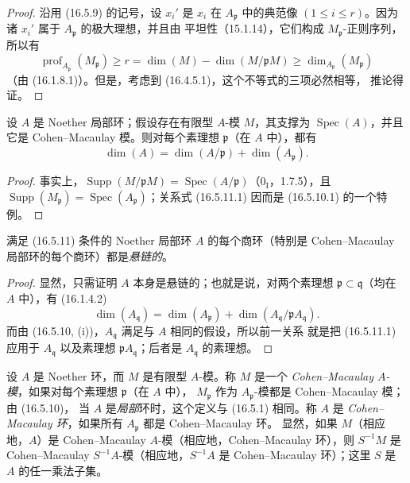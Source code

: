 \begin{proof}
沿用 (16.5.9) 的记号，设 $x_i'$ 是 $x_i$ 在 $A_{\mathfrak{p}}$ 中的典范像
$(1\leq i\leq r)$。因为诸 $x_i'$ 属于 $A_{\mathfrak{p}}$ 的极大理想，并且由
平坦性（15.1.14），它们构成 $M_{\mathfrak{p}}$-正则序列，所以有
\[
  \operatorname{prof}_{A_{\mathfrak{p}}}(M_{\mathfrak{p}})
  \geq r=\dim(M)-\dim(M/\mathfrak{p}M)
  \geq\dim_{A_{\mathfrak{p}}}(M_{\mathfrak{p}})
\]
（由 (16.1.8.1)）。但是，考虑到 (16.4.5.1)，这个不等式的三项必然相等，
推论得证。
\end{proof}


\begin{corollary}[16.5.11]
\label{0.16.5.11-fr}
设 $A$ 是 Noether 局部环；假设存在有限型 $A$-模 $M$，其支撑为
$\operatorname{Spec}(A)$，并且它是 Cohen--Macaulay 模。则对每个素理想
$\mathfrak{p}$（在 $A$ 中），都有
\begin{equation}
\label{0.16.5.11.1-fr}
\tag{16.5.11.1}
  \dim(A)=\dim(A/\mathfrak{p})+\dim(A_{\mathfrak{p}}).
\end{equation}
\end{corollary}

\begin{proof}
事实上，$\operatorname{Supp}(M/\mathfrak{p}M)
=\operatorname{Spec}(A/\mathfrak{p})$（$0_{\mathrm I}$，1.7.5），且
$\operatorname{Supp}(M_{\mathfrak{p}})
=\operatorname{Spec}(A_{\mathfrak{p}})$；关系式 (16.5.11.1) 因而是
(16.5.10.1) 的一个特例。
\end{proof}

\begin{corollary}[16.5.12]
\label{0.16.5.12-fr}
满足 (16.5.11) 条件的 Noether 局部环 $A$ 的每个商环（特别是
Cohen--Macaulay 局部环的每个商环）都是\emph{悬链的}。
\end{corollary}

\begin{proof}
显然，只需证明 $A$ 本身是悬链的；也就是说，对两个素理想
$\mathfrak{p}\subset\mathfrak{q}$（均在 $A$ 中），有 (16.1.4.2)
\[
  \dim(A_{\mathfrak{q}})
  =\dim(A_{\mathfrak{p}})
  +\dim(A_{\mathfrak{q}}/\mathfrak{p}A_{\mathfrak{q}}).
\]
而由 (16.5.10, (i))，$A_{\mathfrak{q}}$ 满足与 $A$ 相同的假设，所以前一关系
就是把 (16.5.11.1) 应用于 $A_{\mathfrak{q}}$ 以及素理想
$\mathfrak{p}A_{\mathfrak{q}}$；后者是 $A_{\mathfrak{q}}$ 的素理想。
\end{proof}

\begin{env}[16.5.13]
\label{0.16.5.13-fr}
设 $A$ 是 Noether 环，而 $M$ 是有限型 $A$-模。称 $M$ 是一个
\emph{Cohen--Macaulay $A$-模}，如果对每个素理想 $\mathfrak{p}$（在 $A$ 中），
$M_{\mathfrak{p}}$ 作为 $A_{\mathfrak{p}}$-模都是 Cohen--Macaulay 模；由 (16.5.10)，
当 $A$ 是\emph{局部}环时，这个定义与 (16.5.1) 相同。称 $A$ 是
\emph{Cohen--Macaulay 环}，如果所有 $A_{\mathfrak{p}}$ 都是 Cohen--Macaulay 环。
显然，如果 $M$（相应地，$A$）是 Cohen--Macaulay
$A$-模（相应地，Cohen--Macaulay 环），则 $S^{-1}M$ 是 Cohen--Macaulay
$S^{-1}A$-模（相应地，$S^{-1}A$ 是 Cohen--Macaulay 环）；这里 $S$ 是 $A$ 的任一乘法子集。
\end{env}

